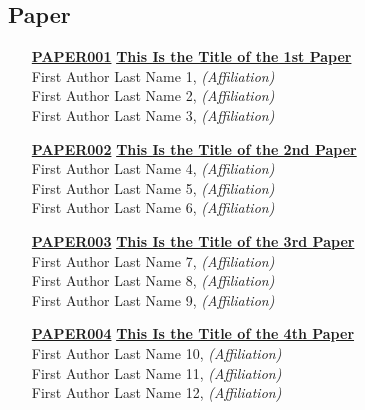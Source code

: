 
\subsection{Paper}
\begin{enumerate}
\item[\href{https://doi.org/10.1145/1122445.1122456}{\textbf{PAPER001}}]
\href{https://doi.org/10.1145/1122445.1122456}{\textbf{This Is the Title of the 1st Paper}}\\
First Author Last Name 1, \emph{(Affiliation)}\\
First Author Last Name 2, \emph{(Affiliation)}\\
First Author Last Name 3, \emph{(Affiliation)}\\

\item[\href{https://doi.org/10.1145/1122445.1122456}{\textbf{PAPER002}}]
\href{https://doi.org/10.1145/1122445.1122456}{\textbf{This Is the Title of the 2nd Paper}}\\
First Author Last Name 4, \emph{(Affiliation)}\\
First Author Last Name 5, \emph{(Affiliation)}\\
First Author Last Name 6, \emph{(Affiliation)}\\

\item[\href{https://doi.org/10.1145/1122445.1122456}{\textbf{PAPER003}}]
\href{https://doi.org/10.1145/1122445.1122456}{\textbf{This Is the Title of the 3rd Paper}}\\
First Author Last Name 7, \emph{(Affiliation)}\\
First Author Last Name 8, \emph{(Affiliation)}\\
First Author Last Name 9, \emph{(Affiliation)}\\

\item[\href{https://doi.org/10.1145/1122445.1122456}{\textbf{PAPER004}}]
\href{https://doi.org/10.1145/1122445.1122456}{\textbf{This Is the Title of the 4th Paper}}\\
First Author Last Name 10, \emph{(Affiliation)}\\
First Author Last Name 11, \emph{(Affiliation)}\\
First Author Last Name 12, \emph{(Affiliation)}\\


\end{enumerate}

